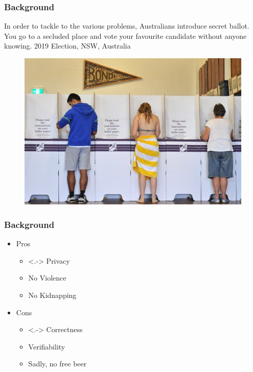 \documentclass{beamer}
\begin{document}
 
 
   
\begin{frame}
\frametitle{Background}
{In order to tackle to the various problems, Australians introduce 
 secret ballot. You go to a secluded place and vote your favourite candidate without 
 anyone knowing. 2019 Election, NSW, Australia}
\begin{figure}
	\begin{center}
	\includegraphics[scale=0.50]{image-20160525-25209-cn3ftj.jpg}
	\end{center}
  \end{figure}   
\end{frame}


\begin{frame}
\frametitle{Background}
\begin{itemize}[]
\item Pros 
\begin{itemize}
\item<.-> Privacy 
\item No Violence
\item No Kidnapping
\end{itemize}
\item Cons
\begin{itemize}
\item<.-> Correctness
\item Verifiability
\item Sadly, no free beer
\end{itemize}
\end{itemize}
\end{frame}
\end{document}

